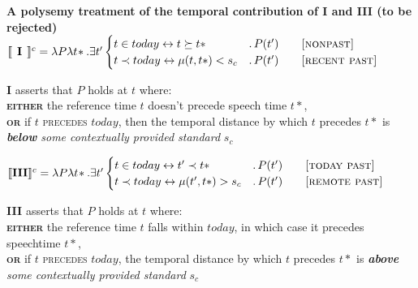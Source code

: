\pex\textbf{A polysemy treatment of the temporal contribution of \textbf{I} and \textbf{III} (to be rejected)}
	\a$\llbracket\textbf{\phantom{I}I\phantom{I}}\rrbracket^{c}=\lambda P\lambda t\!*.\exists t'\begin{cases}t\in today\leftrightarrow t\succeq t*&.\,P(t')\qquad\textsc{[nonpast]}\\
	t\prec today \leftrightarrow \mu(t,t*)<s_c&.\,P(t')\qquad\textsc{[recent past]}
\end{cases}$

\textbf{I} asserts that $ P $ holds at $ t $ where:\\
\textbf{\textsc{either}} the reference time $ t$ doesn't precede speech time $ t*$,\\ \textbf{\textsc{or}} if $ t $ \textsc{precedes}  $ today $, then the temporal distance by which $ t $ precedes $ t* $ is \textit{\textbf{below} some contextually provided standard} $ s_c $

\a$\llbracket\textbf{III}\rrbracket^{c}=\lambda P\lambda t\!*.\exists t'\begin{cases}t\in today\leftrightarrow t'\prec t*&.\,P(t')\qquad\textsc{[today past]}\\
	t\prec today \leftrightarrow\mu(t',t*)>s_c&.\,P(t')\qquad\textsc{[remote past]}
\end{cases}$

\textbf{III} asserts that $ P $ holds at $ t $ where: \\
\textbf{\textsc{either}} the reference time $ t $ falls within $ today $, in which case it precedes speechtime $ t* $,\\ \textbf{\textsc{or}} if $ t $ \textsc{precedes} $ today $, the temporal distance by which $ t $ precedes $ t* $ is \textit{\textbf{above} some contextually provided standard} $ s_c $
\xe


